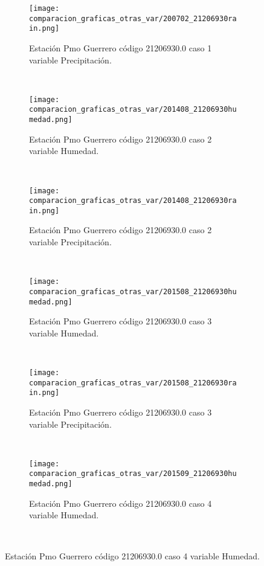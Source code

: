 \begin{figure}[H]
\centering
\begin{subfigure}[normla]{0.4\textwidth}
\caption{Estación Pmo Guerrero código 21206930.0 caso 1 variable Precipitación.}
\texttt{[image: comparacion\_graficas\_otras\_var/200702\_21206930rain.png]}
\end{subfigure}
~
\begin{subfigure}[normla]{0.4\textwidth}
\caption{Estación Pmo Guerrero código 21206930.0 caso 2 variable Humedad.}
\texttt{[image: comparacion\_graficas\_otras\_var/201408\_21206930humedad.png]}
\end{subfigure}
~
\begin{subfigure}[normla]{0.4\textwidth}
\caption{Estación Pmo Guerrero código 21206930.0 caso 2 variable Precipitación.}
\texttt{[image: comparacion\_graficas\_otras\_var/201408\_21206930rain.png]}
\end{subfigure}
~
\begin{subfigure}[normla]{0.4\textwidth}
\caption{Estación Pmo Guerrero código 21206930.0 caso 3 variable Humedad.}
\texttt{[image: comparacion\_graficas\_otras\_var/201508\_21206930humedad.png]}
\end{subfigure}
~
\begin{subfigure}[normla]{0.4\textwidth}
\caption{Estación Pmo Guerrero código 21206930.0 caso 3 variable Precipitación.}
\texttt{[image: comparacion\_graficas\_otras\_var/201508\_21206930rain.png]}
\end{subfigure}
~
\begin{subfigure}[normla]{0.4\textwidth}
\caption{Estación Pmo Guerrero código 21206930.0 caso 4 variable Humedad.}
\texttt{[image: comparacion\_graficas\_otras\_var/201509\_21206930humedad.png]}
\end{subfigure}
~
\end{figure}
           
